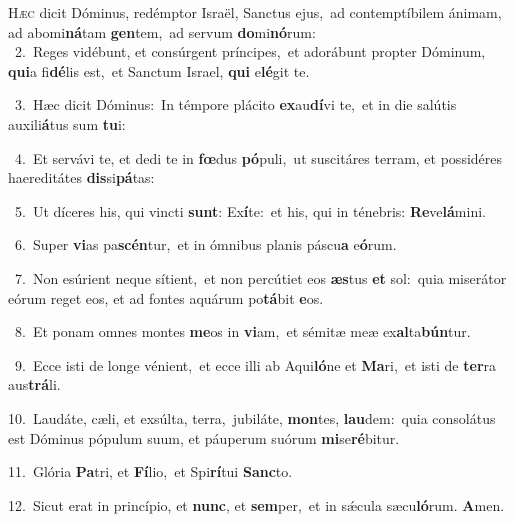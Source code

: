 \lettrine{\initial\textcolor{\initialcolor}{H}}{æc} dicit Dóminus, redémptor Israël, Sanctus ejus,~\dagger ad contemptíbilem ánimam, ad abomi\-\textbf{ná}\-tam \textbf{gen}\-tem,~\star ad servum \textbf{do}\-mi\-\textbf{nó}\-rum:\\
{\numbfont\textcolor{\numbcolor}{~2.}}~Reges vidébunt, et consúrgent príncipes,~\dagger et adorábunt propter Dóminum, \textbf{qui}\-a fi\-\textbf{dé}\-lis est,~\star et Sanctum Israel, \textbf{qui} e\-\textbf{lé}\-git te.\par
{\numbfont\textcolor{\numbcolor}{~3.}}~Hæc dicit Dóminus:~\dagger In témpore plácito \textbf{ex}\-au\-\textbf{dí}\-vi te,~\star et in die salútis auxili\-\textbf{á}\-tus sum \textbf{tu}\-i:\par
{\numbfont\textcolor{\numbcolor}{~4.}}~Et servávi te, et dedi te in \textbf{fœ}\-dus \textbf{pó}\-puli,~\star ut suscitáres terram, et possidéres haereditátes \textbf{dis}\-si\-\textbf{pá}\-tas:\par
{\numbfont\textcolor{\numbcolor}{~5.}}~Ut díceres his, qui vincti \textbf{sunt}\-: Ex\-\textbf{í}\-te:~\star et his, qui in ténebris: \textbf{Re}\-ve\-\textbf{lá}\-mini.\par
{\numbfont\textcolor{\numbcolor}{~6.}}~Super \textbf{vi}\-as pa\-\textbf{scén}\-tur,~\star et in ómnibus planis páscu\textbf{a} e\-\textbf{ó}\-rum.\par
{\numbfont\textcolor{\numbcolor}{~7.}}~Non esúrient neque sítient,~\dagger et non percútiet eos \textbf{æs}\-tus \textbf{et} sol:~\star quia miserátor eórum reget eos, et ad fontes aquárum po\-\textbf{tá}\-bit \textbf{e}\-os.\par
{\numbfont\textcolor{\numbcolor}{~8.}}~Et ponam omnes montes \textbf{me}\-os in \textbf{vi}\-am,~\star et sémitæ meæ ex\-\textbf{al}\-ta\-\textbf{bún}\-tur.\par
{\numbfont\textcolor{\numbcolor}{~9.}}~Ecce isti de longe vénient,~\dagger et ecce illi ab Aqui\-\textbf{ló}\-ne et \textbf{Ma}\-ri,~\star et isti de \textbf{ter}\-ra aus\-\textbf{trá}\-li.\par
{\numbfont\textcolor{\numbcolor}{10.}}~Laudáte, cæli, et exsúlta, terra,~\dagger jubiláte, \textbf{mon}\-tes, \textbf{lau}\-dem:~\star quia consolátus est Dóminus pópulum suum, et páuperum suórum \textbf{mi}\-se\-\textbf{ré}\-bitur.\par
{\numbfont\textcolor{\numbcolor}{11.}}~Glória \textbf{Pa}\-tri, et \textbf{Fí}\-lio,~\star et Spi\-\textbf{rí}\-tui \textbf{Sanc}\-to.\par
{\numbfont\textcolor{\numbcolor}{12.}}~Sicut erat in princípio, et \textbf{nunc}\-, et \textbf{sem}\-per,~\star et in sǽcula sæcu\-\textbf{ló}\-rum. \textbf{A}\-men.\par
